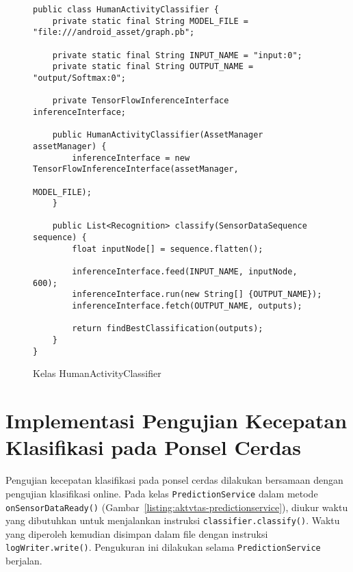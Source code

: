 \begin{figure}[h!]
\begin{verbatim}
public class HumanActivityClassifier {
    private static final String MODEL_FILE = "file:///android_asset/graph.pb";

    private static final String INPUT_NAME = "input:0";
    private static final String OUTPUT_NAME = "output/Softmax:0";

    private TensorFlowInferenceInterface inferenceInterface;

    public HumanActivityClassifier(AssetManager assetManager) {
        inferenceInterface = new TensorFlowInferenceInterface(assetManager,
                                                              MODEL_FILE);
    }

    public List<Recognition> classify(SensorDataSequence sequence) {
        float inputNode[] = sequence.flatten();

        inferenceInterface.feed(INPUT_NAME, inputNode, 600);
        inferenceInterface.run(new String[] {OUTPUT_NAME});
        inferenceInterface.fetch(OUTPUT_NAME, outputs);

        return findBestClassification(outputs);
    }
}
\end{verbatim}
\caption{Kelas HumanActivityClassifier}
\label{listing:aktvtas-humanactivityclassifier}
\end{figure}

\section{Implementasi Pengujian Kecepatan Klasifikasi pada Ponsel Cerdas}

Pengujian kecepatan klasifikasi pada ponsel cerdas dilakukan bersamaan dengan pengujian klasifikasi online. Pada kelas \texttt{PredictionService} dalam metode \texttt{onSensorDataReady()} (Gambar~\ref{listing:aktvtas-predictionservice}), diukur waktu yang dibutuhkan untuk menjalankan instruksi \texttt{classifier.classify()}. Waktu yang diperoleh kemudian disimpan dalam file dengan instruksi \texttt{logWriter.write()}. Pengukuran ini dilakukan selama \texttt{PredictionService} berjalan.
